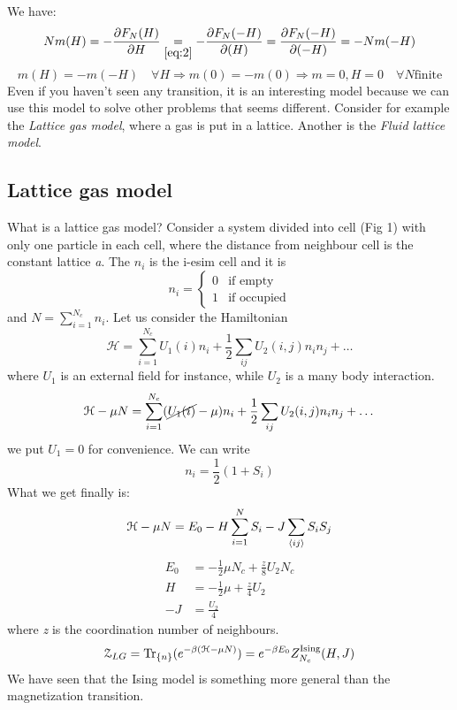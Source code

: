 \documentclass[../main/main.tex]{subfiles}
\begin{document}
We have:
\begin{equation}
  N m (H) = - \pdv{F_N (H)}{H} \underset{\eqref{eq:2}}{=}  - \pdv{F_N (-H)}{(H)} = \pdv{F_N(-H)}{(-H)}  = - N m (-H)
\end{equation}
\begin{equation}
  m(H) = -m (-H) \quad \forall H \Rightarrow m(0)=-m(0) \Rightarrow m=0,H=0 \quad  \forall N \text{finite}
\end{equation}
Even if you haven't seen any transition, it is an interesting model because we can use this model to solve other problems that seems different.
Consider for example the \emph{Lattice gas model}, where a gas is put in a lattice. Another is the \emph{Fluid lattice model}.

\subsection{Lattice gas model}
What is a lattice gas model?
Consider a system divided into cell (Fig 1) with only one particle in each cell, where the distance from neighbour cell is the constant lattice \emph{a}. The \( n_i \) is the i-esim cell and it is
\begin{equation}
n_i =
  \begin{cases}
   0 & \text{if empty} \\
   1 & \text{if occupied}
  \end{cases}
\end{equation}
and \( N = \sum_{i=1}^{N_c} n_i  \). Let us consider the Hamiltonian
\begin{equation}
  \mathcal{H} = \sum_{i=1}^{N_c} U_1 (i) n_i + \frac{1}{2} \sum_{ij}^{} U_2 (i,j) n_i n_j +   \dots
\end{equation}
where \( U_1 \) is an external field for instance, while \( U_2 \) is a many body interaction.
\begin{equation}
  \mathcal{H} - \mu N = \sum_{i=1}^{N_c} ( \cancel{ U_1 (i)} - \mu) n_i + \frac{1}{2} \sum_{ij}^{} U_2 (i,j) n_i n_j +   \dots
\end{equation}
we put \( U_1=0 \) for convenience.
We can write
\begin{equation}
  n_i = \frac{1}{2} (1+S_i)
\end{equation}
What we get finally is:
\begin{equation}
    \mathcal{H} - \mu N  =  E_0 - H \sum_{i=1}^{N} S_i - J \sum_{\expval{ij} }^{} S_i S_j
\end{equation}
\begin{subequations}
\begin{align}
     E_0 & = - \frac{1}{2} \mu N_c + \frac{z}{8} U_2 N_c \\
       H &= - \frac{1}{2} \mu + \frac{z}{4} U_2 \\
         -J & = \frac{U_2}{4}
\end{align}
\end{subequations}
where \emph{z} is the coordination number of neighbours.
\begin{equation}
  \mathcal{Z}_{LG} = \Tr_{\{n\}}(e^{-\beta (\mathcal{H}-\mu N)} ) = e^{-\beta E_0} Z_{N_c}^{\text{Ising}} (H,J)
\end{equation}
We have seen that the Ising model is something more general than the magnetization transition.
\end{document}
